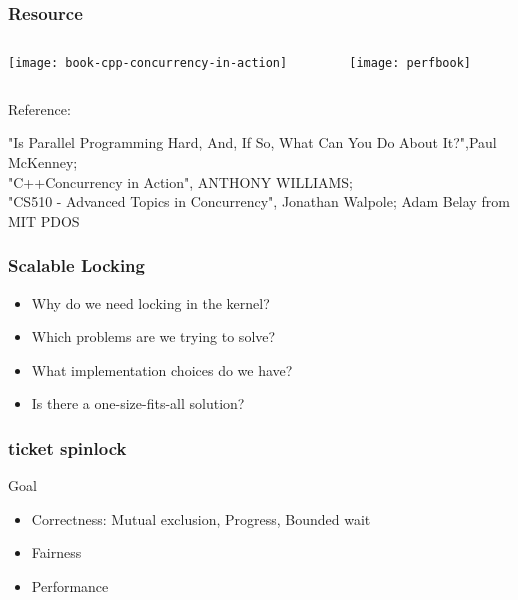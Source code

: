 \begin{frame}
    \frametitle{Resource}
    
    
    

	\begin{columns}
    
    \begin{column}{.5\textwidth}
        \centering
        
        \texttt{[image: book-cpp-concurrency-in-action]}
        
    \end{column}
    
    \begin{column}{.5\textwidth}
        
      \texttt{[image: perfbook]}
       
        
    \end{column}
    
    
\end{columns}
    
    \tiny Reference:
    
    "Is Parallel Programming Hard, And, If So, What Can You Do About It?",Paul McKenney;\\
    "C++Concurrency in Action", ANTHONY WILLIAMS; \\
    "CS510 - Advanced Topics in Concurrency", Jonathan Walpole;
    Adam Belay from MIT PDOS
\end{frame}

\begin{frame}[fragile]
    \frametitle{Scalable Locking}
    \Large
    \begin{itemize}
    \item Why do we need locking in the kernel?
    \item Which problems are we trying to solve?
    \item What implementation choices do we have?
    \item Is there a one-size-fits-all solution?
  
\end{itemize}
    
\end{frame}


\begin{frame}[fragile]
    \frametitle{ticket spinlock}
    \Large
    Goal
    \begin{itemize}
        \item Correctness:  Mutual exclusion, Progress, Bounded wait
        \item  Fairness       
        \item Performance
        
        
    \end{itemize}
    
\end{frame}


